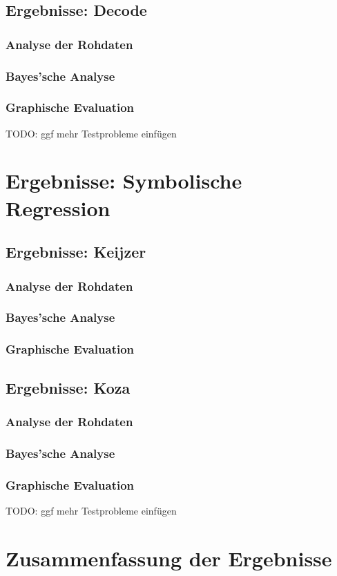 \subsection{Ergebnisse: Decode}
\label{subsec:ergebnisseDecode}
\subsubsection{Analyse der Rohdaten}
\label{decode:analyseRohdaten}
\subsubsection{Bayes'sche Analyse}
\label{decode:bayes}
\subsubsection{Graphische Evaluation}
\label{decode: graphische Evaluation}

TODO: ggf mehr Testprobleme einfügen

\section{Ergebnisse: Symbolische Regression}
\label{sec:ergebnisseSR}

\subsection{Ergebnisse: Keijzer}
\label{subsec:ergebnisseKeijzer}
\subsubsection{Analyse der Rohdaten}
\label{keijzer:analyseRohdaten}
\subsubsection{Bayes'sche Analyse}
\label{keijzer:bayes}
\subsubsection{Graphische Evaluation}
\label{keijzer: graphische Evaluation}


\subsection{Ergebnisse: Koza}
\label{subsec:ergebnisseKoza}
\subsubsection{Analyse der Rohdaten}
\label{koza:analyseRohdaten}
\subsubsection{Bayes'sche Analyse}
\label{koza:bayes}
\subsubsection{Graphische Evaluation}
\label{koza: graphische Evaluation}

TODO: ggf mehr Testprobleme einfügen

\section{Zusammenfassung der Ergebnisse}
\label{sec:zusammenfassungErgebnisse}
